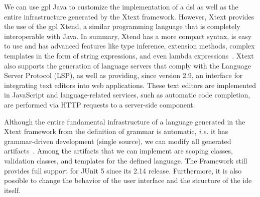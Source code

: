 We can use \ac{gpl} Java to customize the implementation of a \ac{dsl} as well as the entire infrastructure generated by the Xtext framework.
However, Xtext provides the use of the \ac{gpl} Xtend, a similar programming language that is completely interoperable with Java. 
In summary, Xtend has a more compact syntax, is easy to use and has advanced features like type inference, extension methods, complex templates in the form of string expressions, and even lambda expressions~\cite{Bettini:2016}.
Xtext also supports the generation of language servers that comply with the Language Server Protocol (LSP), as well as providing, since version 2.9, an interface for integrating text editors into web applications.
These text editors are implemented in JavaScript and language-related services, such as automatic code completion, are performed via HTTP requests to a server-side component.

Although the entire fundamental infrastructure of a language generated in the Xtext framework from the definition of grammar is automatic, \textit{i.e.} it has grammar-driven development (single source), we can modify all generated artifacts~\cite{XtextSirius:2017}.
Among the artifacts that we can implement are scoping classes, validation classes, and templates for the defined language.
The Framework still provides full support for JUnit 5 since its 2.14 release.
Furthermore, it is also possible to change the behavior of the user interface and the structure of the \ac{ide} itself.



